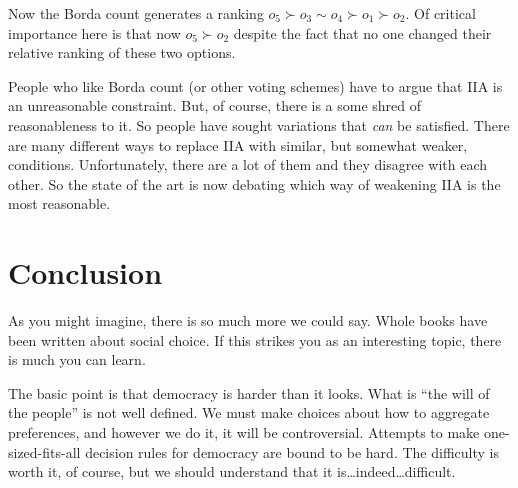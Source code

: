 Now the Borda count generates a ranking $o_5 \succ o_3 \sim o_4 \succ o_1 \succ o_2$.  Of critical importance here is that now $o_5 \succ o_2$ despite the fact that no one changed their relative ranking of these two options.  

People who like Borda count (or other voting schemes) have to argue that IIA is an unreasonable constraint. But, of course, there is a some shred of reasonableness to it.  So people have sought variations that {\it can} be satisfied.  There are many different ways to replace IIA with similar, but somewhat weaker, conditions.  Unfortunately, there are a lot of them and they disagree with each other. So the state of the art is now debating which way of weakening IIA is the most reasonable.

\section{Conclusion}

As you might imagine, there is so much more we could say.  Whole books have been written about social choice.  If this strikes you as an interesting topic, there is much you can learn.

The basic point is that democracy is harder than it looks.  What is ``the will of the people'' is not well defined.  We must make choices about how to aggregate preferences, and however we do it, it will be controversial.  Attempts to make one-sized-fits-all decision rules for democracy are bound to be hard.  The difficulty is worth it, of course, but we should understand that it is\dots indeed\dots difficult.